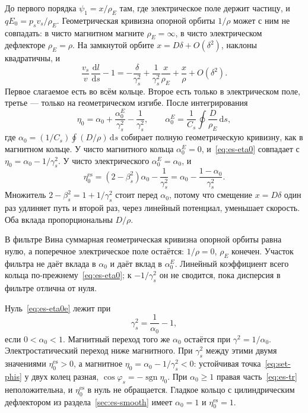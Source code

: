 До первого порядка $\psi_1=x/\rho_E$ там, где электрическое поле держит частицу, и $qE_0=p_s v_s/\rho_E$. Геометрическая кривизна опорной орбиты $1/\rho$ может с ним не совпадать: в чисто магнитном магните $\rho_E=\infty$, в чисто электрическом дефлекторе $\rho_E=\rho$. На замкнутой орбите $x=D\delta+O(\delta^2)$, наклоны квадратичны, и
\begin{equation}
\label{eq:es-lin}
\frac{v_s}{v}\,\frac{\mathrm{d}l}{\mathrm{d}s}-1
=-\frac{\delta}{\gamma_s^2}+\frac{1}{\gamma_s^2}\frac{x}{\rho_E}+\frac{x}{\rho}+O(\delta^2).
\end{equation}
Первое слагаемое есть во всём кольце. Второе есть только в электрическом поле, третье --- только на геометрическом изгибе. После интегрирования
\begin{equation}
\label{eq:es-eta0}
\eta_0=\alpha_0+\frac{\alpha_0^{E}}{\gamma_s^2}-\frac{1}{\gamma_s^2},
\qquad
\alpha_0^{E}=\frac{1}{C_s}\oint\frac{D}{\rho_E}\,\mathrm{d}s,
\end{equation}
где $\alpha_0=(1/C_s)\oint(D/\rho)\,\mathrm{d}s$ собирает полную геометрическую кривизну, как в магнитном кольце. У чисто магнитного кольца $\alpha_0^{E}=0$, и~\eqref{eq:es-eta0} совпадает с $\eta_0=\alpha_0-1/\gamma_s^2$. У чисто электрического $\alpha_0^{E}=\alpha_0$, и
\begin{equation}
\label{eq:es-eta0e}
\eta_0^{\mathrm{es}}
=(2-\beta_s^2)\alpha_0-\frac{1}{\gamma_s^2}
=\alpha_0-\frac{1-\alpha_0}{\gamma_s^2}.
\end{equation}
Множитель $2-\beta_s^2=1+1/\gamma_s^2$ стоит перед $\alpha_0$, потому что смещение $x=D\delta$ один раз удлиняет путь и второй раз, через линейный потенциал, уменьшает скорость. Оба вклада пропорциональны $D/\rho$.

В фильтре Вина суммарная геометрическая кривизна опорной орбиты равна нулю, а поперечное электрическое поле остаётся: $1/\rho=0$, $\rho_E$ конечен. Участок фильтра не даёт вклада в $\alpha_0$ и даёт вклад в $\alpha_0^{E}$. Линейный коэффициент всего кольца по-прежнему~\eqref{eq:es-eta0}; к $-1/\gamma_s^2$ он не сводится, пока дисперсия в фильтре отлична от нуля.

Нуль~\eqref{eq:es-eta0e} лежит при
\begin{equation}
\label{eq:es-tr}
\gamma_s^2=\frac{1}{\alpha_0}-1,
\end{equation}
если $0<\alpha_0<1$. Магнитный переход того же $\alpha_0$ остаётся при $\gamma^2=1/\alpha_0$. Электростатический переход ниже магнитного. При $\gamma_s^2$ между этими двумя значениями $\eta_0^{\mathrm{es}}>0$, а магнитное $\eta_0=\alpha_0-1/\gamma_s^2<0$: устойчивая точка~\eqref{eq:set-phis} у двух колец разная, $\cos\varphi_s=-\operatorname{sgn}\eta_0$. При $\alpha_0\ge 1$ правая часть~\eqref{eq:es-tr} неположительна, и $\eta_0^{\mathrm{es}}$ в нуль не обращается. Гладкое кольцо с цилиндрическим дефлектором из раздела~\ref{sec:es-smooth} имеет $\alpha_0=1$ и $\eta_0^{\mathrm{es}}=1$.

